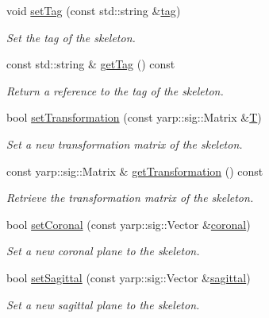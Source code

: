 \begin{DoxyCompactItemize}
void \hyperlink{classassistive__rehab_1_1Skeleton_ae1c830e3d9a0ba692e5ae297caa52a82}{set\+Tag} (const std\+::string \&\hyperlink{classassistive__rehab_1_1Skeleton_a3d1ce5280300e012826948dc4383c2cb}{tag})
\begin{DoxyCompactList}\small\item\em Set the tag of the skeleton. \end{DoxyCompactList}\item 
const std\+::string \& \hyperlink{classassistive__rehab_1_1Skeleton_a185654045d5e43b3853cdb8fdd676da6}{get\+Tag} () const
\begin{DoxyCompactList}\small\item\em Return a reference to the tag of the skeleton. \end{DoxyCompactList}\item 
bool \hyperlink{classassistive__rehab_1_1Skeleton_a3486cbd7f59e75c1d9ef26cbc05bb72f}{set\+Transformation} (const yarp\+::sig\+::\+Matrix \&\hyperlink{classassistive__rehab_1_1Skeleton_a358a1c5eb23a562f8558ff8d43583ef7}{T})
\begin{DoxyCompactList}\small\item\em Set a new transformation matrix of the skeleton. \end{DoxyCompactList}\item 
const yarp\+::sig\+::\+Matrix \& \hyperlink{classassistive__rehab_1_1Skeleton_a2bdcc0d686a5a232aa2c07528cf2e647}{get\+Transformation} () const
\begin{DoxyCompactList}\small\item\em Retrieve the transformation matrix of the skeleton. \end{DoxyCompactList}\item 
bool \hyperlink{classassistive__rehab_1_1Skeleton_ab3bd697f48ea69cfdc5ff7574c19041f}{set\+Coronal} (const yarp\+::sig\+::\+Vector \&\hyperlink{classassistive__rehab_1_1Skeleton_ad042a7e60e6d72cc87b06c5fb0bdfae2}{coronal})
\begin{DoxyCompactList}\small\item\em Set a new coronal plane to the skeleton. \end{DoxyCompactList}\item 
bool \hyperlink{classassistive__rehab_1_1Skeleton_af92fdb0e3eb88a0b1dedd5038e2c6eb7}{set\+Sagittal} (const yarp\+::sig\+::\+Vector \&\hyperlink{classassistive__rehab_1_1Skeleton_a72d6ccb619619e77a17258b08496a972}{sagittal})
\begin{DoxyCompactList}\small\item\em Set a new sagittal plane to the skeleton. \end{DoxyCompactList}\item 

\end{DoxyCompactItemize}
